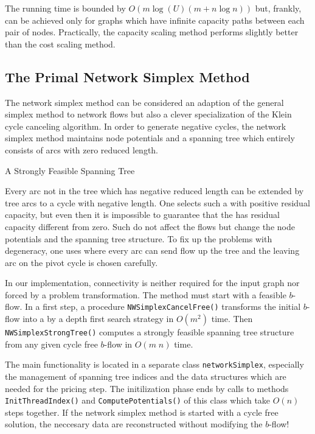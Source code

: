 \documentclass[a4paper,11pt,twoside]{book}
\begin{document}
\begin{multicols}{2}
The running time is bounded by $O(m\log(U)(m+n\log{n}))$ but, frankly, can be
achieved only for graphs which have infinite capacity paths between each pair
of nodes. Practically, the capacity scaling method performs slightly better
than the cost scaling method.


\subsection{The Primal Network Simplex Method}
The network simplex method can be considered an adaption of the general simplex
method to network flows but also a clever specialization of the Klein cycle
canceling algorithm. In order to generate negative cycles, the network simplex
method maintains node potentials and a spanning tree which entirely consists of
arcs with zero reduced length.

\bigskip
\begin{figurehere}
\begin{center}
\epsfxsize=13cm
\vspace{0.5cm}
\caption{\label{flb_nwsimplex}A Strongly Feasible Spanning Tree}
\end{center}
\end{figurehere}

\noindent
Every arc not in the tree which has negative reduced length can be extended
by tree arcs to a cycle with negative length. One selects such a 
with positive residual capacity, but even then it is impossible to guarantee
that the  has residual capacity different from zero. Such
 do not affect the flows but change the node
potentials and the spanning tree structure. To fix up the problems with
degeneracy, one uses  where
every arc can send flow up the tree and the leaving arc on the pivot cycle
is chosen carefully.

In our implementation, connectivity is neither required for the input graph
nor forced by a problem transformation. The method must start with a feasible
$b$-flow. In a first step, a procedure \verb/NWSimplexCancelFree()/
transforms the initial $b$-flow into a  by a depth
first search strategy in $O(m^2)$ time. Then \verb/NWSimplexStrongTree()/
computes a strongly feasible spanning tree structure from any given cycle
free $b$-flow in $O(m\;n)$ time.

The main functionality is located in a separate class \verb/networkSimplex/,
especially the management of spanning tree indices and the data structures
which are needed for the pricing step. The initilization phase ends by calls
to methods \verb/InitThreadIndex()/ and \verb/ComputePotentials()/ of this
class which take $O(n)$ steps together. If the network simplex method is
started with a cycle free solution, the neccesary data are reconstructed
without modifying the $b$-flow!


\end{multicols}
\end{document}

